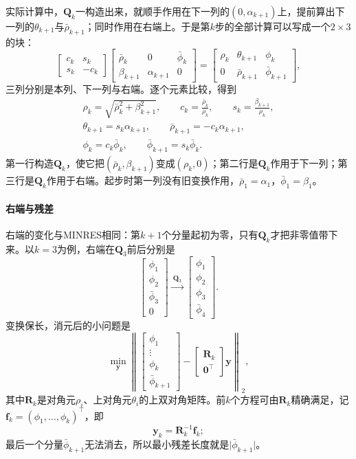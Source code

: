 实际计算中，$\bm Q_k$一构造出来，就顺手作用在下一列的$(0,\alpha_{k+1})$上，提前算出下一列的$\theta_{k+1}$与$\bar\rho_{k+1}$；同时作用在右端上。于是第$k$步的全部计算可以写成一个$2\times3$的块：
\[
 \begin{bmatrix}c_k&s_k\\s_k&-c_k\end{bmatrix}
 \begin{bmatrix}\bar\rho_k&0&\bar\phi_k\\\beta_{k+1}&\alpha_{k+1}&0\end{bmatrix}
 =\begin{bmatrix}\rho_k&\theta_{k+1}&\phi_k\\0&\bar\rho_{k+1}&\bar\phi_{k+1}\end{bmatrix},
\]
三列分别是本列、下一列与右端。逐个元素比较，得到
\begin{equation}
 \begin{gathered}
 \rho_k=\sqrt{\bar\rho_k^2+\beta_{k+1}^2},\qquad
 c_k=\frac{\bar\rho_k}{\rho_k},\qquad s_k=\frac{\beta_{k+1}}{\rho_k},\\
 \theta_{k+1}=s_k\alpha_{k+1},\qquad
 \bar\rho_{k+1}=-c_k\alpha_{k+1},\\
 \phi_k=c_k\bar\phi_k,\qquad
 \bar\phi_{k+1}=s_k\bar\phi_k .
 \end{gathered}
 \label{eq:ls-lsqr-rotation}
\end{equation}
第一行构造$\bm Q_k$，使它把$(\bar\rho_k,\beta_{k+1})$变成$(\rho_k,0)$；第二行是$\bm Q_k$作用于下一列；第三行是$\bm Q_k$作用于右端。起步时第一列没有旧变换作用，$\bar\rho_1=\alpha_1$，$\bar\phi_1=\beta_1$。

\paragraph{右端与残差}
右端的变化与MINRES相同：第$k+1$个分量起初为零，只有$\bm Q_k$才把非零值带下来。以$k=3$为例，右端在$\bm Q_3$前后分别是
\[
 \begin{bmatrix}\phi_1\\\phi_2\\\bar\phi_3\\0\end{bmatrix}
 \xrightarrow{\ \bm Q_3\ }
 \begin{bmatrix}\phi_1\\\phi_2\\\phi_3\\\bar\phi_4\end{bmatrix}.
\]
变换保长，消元后的小问题是
\[
 \min_{\bm y}\left\lVert\begin{bmatrix}\phi_1\\\vdots\\\phi_k\\\bar\phi_{k+1}\end{bmatrix}-\begin{bmatrix}\bm R_k\\\bm 0^\top\end{bmatrix}\bm y\right\rVert_2 ,
\]
其中$\bm R_k$是对角元$\rho_i$、上对角元$\theta_i$的上双对角矩阵。前$k$个方程可由$\bm R_k$精确满足，记$\bm f_k=(\phi_1,\ldots,\phi_k)^\top$，即
\[
 \bm y_k=\bm R_k^{-1}\bm f_k ;
\]
最后一个分量$\bar\phi_{k+1}$无法消去，所以最小残差长度就是$\lvert\bar\phi_{k+1}\rvert$。

